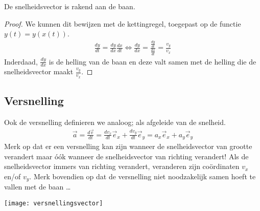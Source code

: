 \documentclass{ximera}
\begin{document}
	
	\begin{eigenschap}
	De snelheidsvector is rakend aan de baan.
	\end{eigenschap}
	\begin{proof}
	We kunnen dit bewijzen met de kettingregel, toegepast op de functie $y(t)=y(x(t))$.
	\begin{eqnarray*}
	 \frac{dy}{dt}=\frac{dy}{dx}\frac{dx}{dt}\Leftrightarrow\frac{dy}{dx}=\frac{\frac{dy}{dt}}{\frac{dx}{dt}}=\frac{v_y}{v_x}
	\end{eqnarray*}
	Inderdaad, $\frac{dy}{dx}$ is de helling van de baan en deze valt samen met de helling die de snelheidsvector maakt $\frac{v_y}{v_x}$.
	\end{proof}
	
	\subsection{Versnelling}
	
	Ook de versnelling definieren we analoog; als afgeleide van de snelheid.
	\begin{eqnarray*}
	\vec{a}=\frac{d\vec{v}}{dt}=\frac{dv_x}{dt}\vec{e}_x+\frac{dv_y}{dt}\vec{e}_y=a_x\vec{e}_x+a_y\vec{e}_y
	\end{eqnarray*}
	Merk op dat er een versnelling kan zijn wanneer de snelheidsvector van grootte verandert maar \'o\'ok wanneer de snelheidsvector van richting verandert! Als de snelheidsvector immers van richting verandert, veranderen zijn coördinaten $v_x$ en/of $v_y$. Merk bovendien op dat de versnelling niet noodzakelijk samen hoeft te vallen met de baan \ldots
	\begin{image}
	
	\texttt{[image: versnellingsvector]}
	\end{image}
	
	
	
\end{document}
